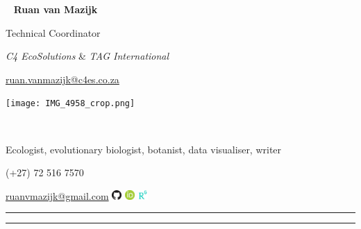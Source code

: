 \begin{multicols}{3}
  \
  \vfill
  \raggedleft
    {\huge \textbf{Ruan van Mazijk}} \par
    {\Large Technical Coordinator} \par
    \textit{C4 EcoSolutions} \& \textit{TAG International} \par
    \href{mailto:ruan.vanmazijk@c4es.co.za}{ruan.vanmazijk@c4es.co.za} \par
  \vfill
  \begin{center}
    \texttt{[image: IMG\_4958\_crop.png]}
  \end{center}
  \columnbreak
  \par \
  \vfill
  \raggedright
    Ecologist, evolutionary biologist, botanist, data visualiser, writer \par
    (+27) 72 516 7570 \par
    \href{mailto:ruanvmazijk@gmail.com}{ruanvmazijk@gmail.com}
      \href{https://github.com/rvanmazijk}
           {\includegraphics[width=1em]{logos/GitHub.png}}
      \href{https://orcid.org/0000-0003-2659-6909}
           {\includegraphics[width=1em]{logos/ORCID.png}}
      \href{https://www.researchgate.net/profile/Ruan-Van-Mazijk}
           {\includegraphics[width=1em]{logos/ResearchGate-white_crop.jpg}}
  \vfill
\end{multicols}

\hrule \vskip2pt \hrule
